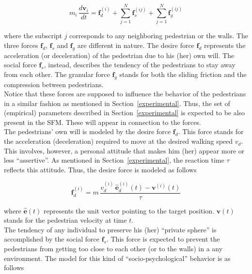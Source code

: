 \documentclass[preprint,12pt]{elsarticle}
\begin{document}
\begin{equation}
 m_i\,\displaystyle\frac{d\mathbf{v}_i}{dt}=\mathbf{f}_d^{(i)}+
 \displaystyle\sum_{j=1}^N\mathbf{f}_s^{(ij)}+
 \displaystyle\sum_{j=1}^N\mathbf{f}_g^{(ij)}\label{eqn_motion}
\end{equation}

\noindent where the subscript $j$ corresponds to any neighboring pedestrian or
the walls. The three forces $\mathbf{f}_d$, $\mathbf{f}_s$ and $\mathbf{f}_g$
are different in nature. The desire force $\mathbf{f}_d$ represents the
acceleration (or deceleration) of the pedestrian due to his (her) own will.  The
social force $\mathbf{f}_s$, instead, describes the tendency of the  pedestrians
to stay away from each other. The granular force $\mathbf{f}_g$  stands for both
the sliding friction and the compression between  pedestrians. \\

Notice that these forces are supposed to influence the behavior of the
pedestrians in a similar fashion as mentioned in Section~\ref{experimental}.
Thus, the set of (empirical) parameters described in Section~\ref{experimental}
is expected to be also present in the SFM. These will appear in connection to
the forces. \\

The pedestrians' own will is modeled by the desire force $\mathbf{f}_d$.  This
force stands for the acceleration (deceleration) required to move  at the
desired walking speed $v_d$. This involves, however, a  personal attitude that
makes him (her) appear more or less ``assertive''. As  mentioned in
Section~\ref{experimental}, the reaction time $\tau$ reflects this
attitude. Thus, the desire force is modeled as follows

\begin{equation}
\mathbf{f}_d^{(i)}=m\,\displaystyle\frac{v_d^{(i)}\,
\hat{\mathbf{e}}_d^{(i)}(t)-
 \mathbf{v}^{(i)}(t)}{\tau}
\end{equation}


\noindent where $\hat{\mathbf{e}}(t)$ represents the unit vector pointing to the
target position. $\mathbf{v}(t)$ stands for the pedestrian velocity at time $t$.
\\

The tendency of any individual to preserve his (her) ``private sphere'' is
accomplished by the social force $\mathbf{f}_s$. This force is expected to
prevent the pedestrians from getting too close to each other (or to the walls)
in a any environment. The model for this kind of  ``socio-psychological''
behavior is as follows
\end{document}
